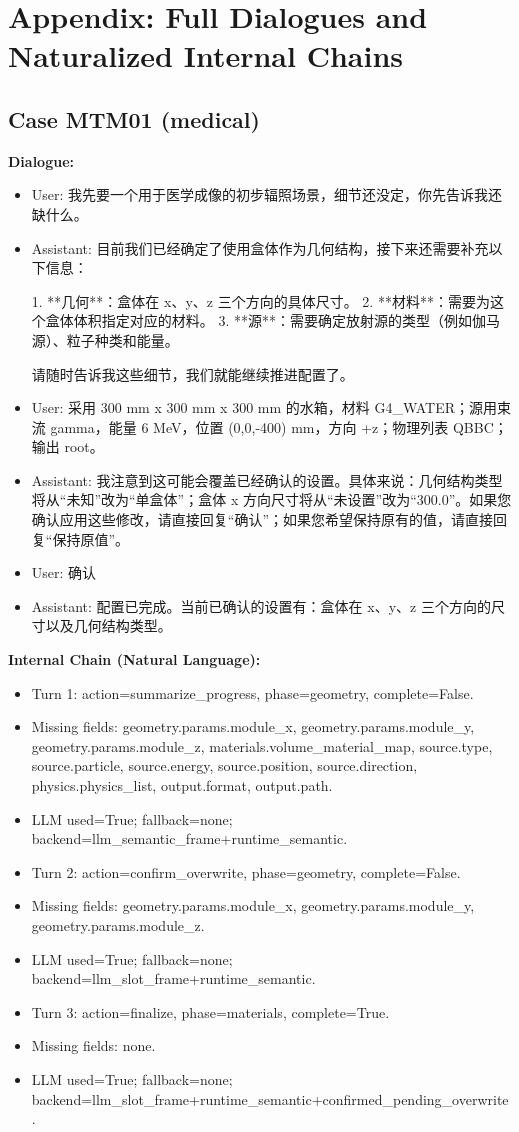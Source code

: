 \documentclass[11pt]{ctexart}
\begin{document}
\section{Appendix: Full Dialogues and Naturalized Internal Chains}
\subsection{Case MTM01 (medical)}
\textbf{Dialogue:}
\begin{itemize}
\item User: 我先要一个用于医学成像的初步辐照场景，细节还没定，你先告诉我还缺什么。
\item Assistant: 目前我们已经确定了使用盒体作为几何结构，接下来还需要补充以下信息：

1.  **几何**：盒体在 x、y、z 三个方向的具体尺寸。
2.  **材料**：需要为这个盒体体积指定对应的材料。
3.  **源**：需要确定放射源的类型（例如伽马源）、粒子种类和能量。

请随时告诉我这些细节，我们就能继续推进配置了。
\item User: 采用 300 mm x 300 mm x 300 mm 的水箱，材料 G4\_WATER；源用束流 gamma，能量 6 MeV，位置 (0,0,-400) mm，方向 +z；物理列表 QBBC；输出 root。
\item Assistant: 我注意到这可能会覆盖已经确认的设置。具体来说：几何结构类型将从“未知”改为“单盒体”；盒体 x 方向尺寸将从“未设置”改为“300.0”。如果您确认应用这些修改，请直接回复“确认”；如果您希望保持原有的值，请直接回复“保持原值”。
\item User: 确认
\item Assistant: 配置已完成。当前已确认的设置有：盒体在 x、y、z 三个方向的尺寸以及几何结构类型。
\end{itemize}
\textbf{Internal Chain (Natural Language):}
\begin{itemize}
\item Turn 1: action=summarize\_progress, phase=geometry, complete=False.
\item Missing fields: geometry.params.module\_x, geometry.params.module\_y, geometry.params.module\_z, materials.volume\_material\_map, source.type, source.particle, source.energy, source.position, source.direction, physics.physics\_list, output.format, output.path.
\item LLM used=True; fallback=none; backend=llm\_semantic\_frame+runtime\_semantic.
\item Turn 2: action=confirm\_overwrite, phase=geometry, complete=False.
\item Missing fields: geometry.params.module\_x, geometry.params.module\_y, geometry.params.module\_z.
\item LLM used=True; fallback=none; backend=llm\_slot\_frame+runtime\_semantic.
\item Turn 3: action=finalize, phase=materials, complete=True.
\item Missing fields: none.
\item LLM used=True; fallback=none; backend=llm\_slot\_frame+runtime\_semantic+confirmed\_pending\_overwrite.
\end{itemize}
\end{document}

